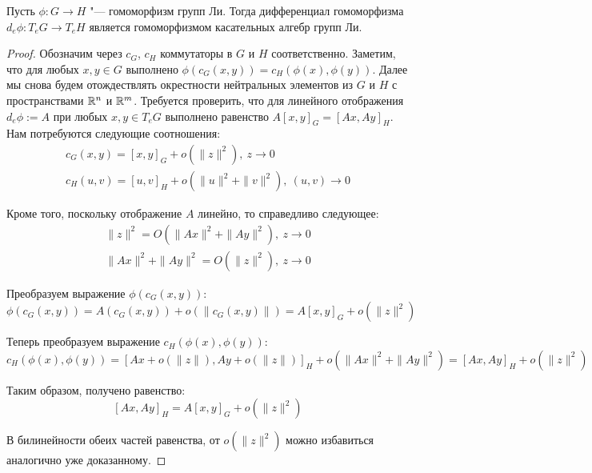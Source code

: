 \begin{theorem}
	Пусть $\phi : G \to H$ "--- гомоморфизм групп Ли. Тогда дифференциал гомоморфизма $d_e\phi: T_eG \to T_eH$ является гомоморфизмом касательных алгебр групп Ли.
\end{theorem}

\begin{proof}
	Обозначим через $c_G$, $c_H$ коммутаторы в $G$ и $H$ соответственно. Заметим, что для любых $x, y \in G$ выполнено $\phi(c_G(x, y)) = c_H(\phi(x), \phi(y))$. Далее мы снова будем отождествлять окрестности нейтральных элементов из $G$ и $H$ с пространствами $\mathbb{R}^n$ и $\mathbb{R}^m$. Требуется проверить, что для линейного отображения $d_e\phi := A$ при любых $x, y \in T_eG$ выполнено равенство $A[x, y]_G = [Ax, Ay]_H$. Нам потребуются следующие соотношения:
	\begin{gather*}
		c_G(x, y) = [x, y]_G + o(\|z\|^2),~z \to 0
		\\
		c_H(u, v) = [u, v]_H + o(\|u\|^2 + \|v\|^2),~(u, v) \to 0
	\end{gather*}
	
	Кроме того, поскольку отображение $A$ линейно, то справедливо следующее:
	\begin{gather*}
		\|z\|^2 = O(\|Ax\|^2 + \|Ay\|^2),~z \to 0
		\\
		\|Ax\|^2 + \|Ay\|^2 = O(\|z\|^2),~z \to 0
	\end{gather*}

	Преобразуем выражение $\phi(c_G(x, y))$:
	\[\phi(c_G(x, y)) = A(c_G(x, y)) + o(\|c_G(x, y)\|) = A[x, y]_G + o(\|z\|^2)\]
	
	Теперь преобразуем выражение $c_H(\phi(x), \phi(y))$:
	\[c_H(\phi(x), \phi(y)) = [Ax + o(\|z\|), Ay + o(\|z\|)]_H + o(\|Ax\|^2 + \|Ay\|^2) = [Ax, Ay]_H + o(\|z\|^2)\]
	
	Таким образом, получено равенство:
	\[[Ax, Ay]_H = A[x, y]_G + o(\|z\|^2)\]
	
	В билинейности обеих частей равенства, от $o(\|z\|^2)$ можно избавиться аналогично уже доказанному.
\end{proof}
